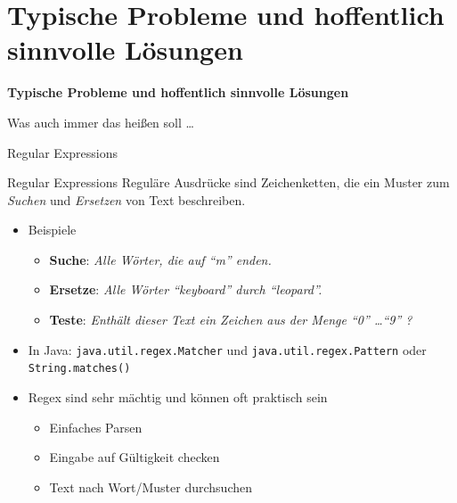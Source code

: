 \documentclass[18pt]{beamer}
\newcommand{\quotes}[1]{``#1''}
\begin{document}
\section{Typische Probleme und hoffentlich sinnvolle Lösungen}

\begin{frame}{\quad}
    \center
    \Huge{\textbf{Typische Probleme und hoffentlich sinnvolle Lösungen}}
\end{frame}

\begin{frame}{\quad}
    \center
    Was auch immer das heißen soll \dots
\end{frame}

\begin{frame}{Regular Expressions}
    \begin{block}{Regular Expressions}
        Reguläre Ausdrücke sind Zeichenketten, die ein Muster zum \textit{Suchen} und \textit{Ersetzen} von Text beschreiben.
    \end{block}

    \begin{itemize}
        \item Beispiele
        \begin{itemize}
            \item \textbf{Suche}: \textit{Alle Wörter, die auf \quotes{m} enden.}
            \item \textbf{Ersetze}: \textit{Alle Wörter \quotes{keyboard} durch \quotes{leopard}.}
            \item \textbf{Teste}: \textit{Enthält dieser Text ein Zeichen aus der Menge \quotes{0} \dots \quotes{9} ?}
        \end{itemize}

        \item In Java: \texttt{java.util.regex.Matcher} und \texttt{java.util.regex.Pattern} oder \texttt{String.matches()}
        \item Regex sind sehr mächtig und können oft praktisch sein
        \begin{itemize}
            \item Einfaches Parsen
            \item Eingabe auf Gültigkeit checken
            \item Text nach Wort/Muster durchsuchen
        \end{itemize}

    \end{itemize}



\end{frame}
\end{document}

